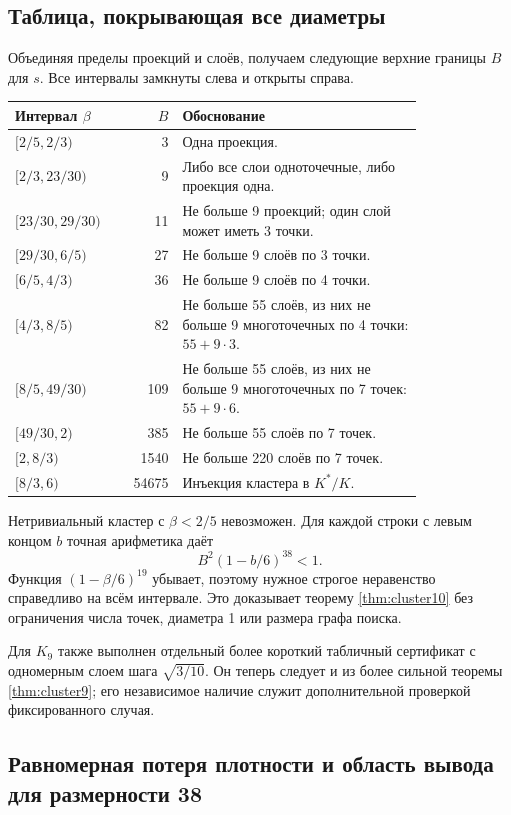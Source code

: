 \documentclass[11pt,a4paper]{article}
\theoremstyle{remark}\newtheorem{remark}[theorem]{Замечание}
\begin{document}
\subsection{Таблица, покрывающая все диаметры}

Объединяя пределы проекций и слоёв, получаем следующие верхние границы $B$ для $s$. Все интервалы замкнуты слева и открыты справа.
\begin{longtable}{P{0.22\linewidth}rP{0.59\linewidth}}
\toprule
Интервал $\beta$ &$B$&Обоснование\\\midrule
\endhead
$[2/5,2/3)$&3&Одна проекция.\\
$[2/3,23/30)$&9&Либо все слои одноточечные, либо проекция одна.\\
$[23/30,29/30)$&11&Не больше 9 проекций; один слой может иметь 3 точки.\\
$[29/30,6/5)$&27&Не больше 9 слоёв по 3 точки.\\
$[6/5,4/3)$&36&Не больше 9 слоёв по 4 точки.\\
$[4/3,8/5)$&82&Не больше 55 слоёв, из них не больше 9 многоточечных по 4 точки: $55+9\cdot3$.\\
$[8/5,49/30)$&109&Не больше 55 слоёв, из них не больше 9 многоточечных по 7 точек: $55+9\cdot6$.\\
$[49/30,2)$&385&Не больше 55 слоёв по 7 точек.\\
$[2,8/3)$&1540&Не больше 220 слоёв по 7 точек.\\
$[8/3,6)$&54675&Инъекция кластера в $K^*/K$.\\
\bottomrule
\end{longtable}
Нетривиальный кластер с $\beta<2/5$ невозможен. Для каждой строки с левым концом $b$ точная арифметика даёт
\[
B^2(1-b/6)^{38}<1.
\]
Функция $(1-\beta/6)^{19}$ убывает, поэтому нужное строгое неравенство справедливо на всём интервале. Это доказывает теорему \ref{thm:cluster10} без ограничения числа точек, диаметра 1 или размера графа поиска.

Для $K_9$ также выполнен отдельный более короткий табличный сертификат с одномерным слоем шага $\sqrt{3/10}$. Он теперь следует и из более сильной теоремы \ref{thm:cluster9}; его независимое наличие служит дополнительной проверкой фиксированного случая.

\subsection{Равномерная потеря плотности и область вывода для размерности 38}
\end{document}
